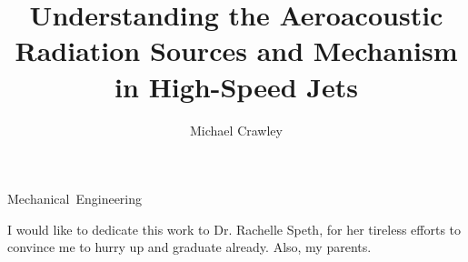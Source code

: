 \documentclass[english,11pt]{osudissert96}
\begin{document}
\author{Michael Crawley}
\title{Understanding the Aeroacoustic Radiation Sources and Mechanism in High-Speed Jets}
\unit{Mechanical Engineering}


\maketitle
\disscopyright

\begin{abstract}
  
\end{abstract}

\begin{dedications}
I would like to dedicate this work to Dr. Rachelle Speth, for her tireless efforts to convince me to hurry up and graduate already. Also, my parents.	
\end{dedications}



\tableofcontents
\listoffigures
       

  




\clearpage  {} {}\clearpage 


\end{document}
